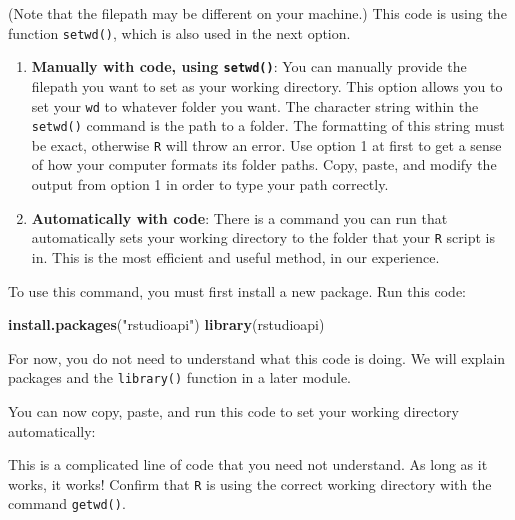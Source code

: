 \documentclass[
]{book}
\newenvironment{Shaded}{\begin{snugshade}}{\end{snugshade}}
\newcommand{\KeywordTok}[1]{\textcolor[rgb]{0.13,0.29,0.53}{\textbf{#1}}}
\newcommand{\NormalTok}[1]{#1}
\newcommand{\OperatorTok}[1]{\textcolor[rgb]{0.81,0.36,0.00}{\textbf{#1}}}
\newcommand{\StringTok}[1]{\textcolor[rgb]{0.31,0.60,0.02}{#1}}
\begin{document}
(Note that the filepath may be different on your machine.) This code is using the function \texttt{setwd()}, which is also used in the next option.

\begin{enumerate}
\def\labelenumi{\arabic{enumi}.}
\setcounter{enumi}{1}
\item
  \textbf{Manually with code, using \texttt{setwd()}}: You can manually provide the filepath you want to set as your working directory. This option allows you to set your \texttt{wd} to whatever folder you want. The character string within the \texttt{setwd()} command is the path to a folder. The formatting of this string must be exact, otherwise \texttt{R} will throw an error. Use option 1 at first to get a sense of how your computer formats its folder paths. Copy, paste, and modify the output from option 1 in order to type your path correctly.
\item
  \textbf{Automatically with code}: There is a command you can run that automatically sets your working directory to the folder that your \texttt{R} script is in. This is the most efficient and useful method, in our experience.
\end{enumerate}

To use this command, you must first install a new package. Run this code:

\begin{Shaded}
\begin{Highlighting}[]
\KeywordTok{install.packages}\NormalTok{(}\StringTok{"rstudioapi"}\NormalTok{)}
\KeywordTok{library}\NormalTok{(rstudioapi)}
\end{Highlighting}
\end{Shaded}

For now, you do not need to understand what this code is doing. We will explain packages and the \texttt{library()} function in a later module.

You can now copy, paste, and run this code to set your working directory automatically:

\begin{Shaded}
\end{Shaded}

This is a complicated line of code that you need not understand. As long as it works, it works! Confirm that \texttt{R} is using the correct working directory with the command \texttt{getwd()}.
\end{document}
